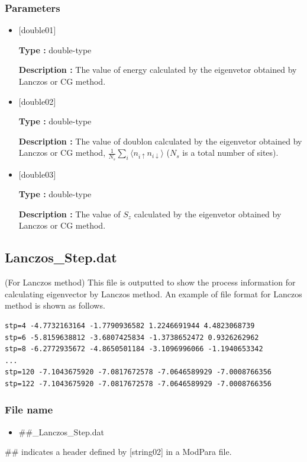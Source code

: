 \subsubsection{Parameters}
 \begin{itemize}

  \item  $[$double01$]$
  
 {\bf Type :} double-type

{\bf Description :} The value of energy calculated by the eigenvetor obtained by Lanczos or CG method.
 
  \item  $[$double02$]$

 {\bf Type :} double-type 

{\bf Description :}  The value of doublon calculated by the eigenvetor obtained by Lanczos or CG method,
$\frac{1}{N_s} \sum_{i}\langle n_{i\uparrow}n_{i\downarrow}\rangle$ ($N_s$ is a total number of sites).

  \item  $[$double03$]$

 {\bf Type :} double-type 

{\bf Description :}  The value of $S_z$ calculated by the eigenvetor obtained by Lanczos or CG method.

 \end{itemize}


\newpage
\subsection{Lanczos\_Step.dat}
(For Lanczos method) 
This file is outputted to show the process information for calculating eigenvector by Lanczos method.
An example of file format for Lanczos method is shown as follows.\\
\begin{minipage}{15cm}
\begin{screen}
\begin{verbatim}
stp=4 -4.7732163164 -1.7790936582 1.2246691944 4.4823068739
stp=6 -5.8159638812 -3.6807425834 -1.3738652472 0.9326262962
stp=8 -6.2772935672 -4.8650501184 -3.1096996066 -1.1940653342
...
stp=120 -7.1043675920 -7.0817672578 -7.0646589929 -7.0008766356
stp=122 -7.1043675920 -7.0817672578 -7.0646589929 -7.0008766356
\end{verbatim}
\end{screen}
\end{minipage}

\subsubsection{File name}
 \begin{itemize}
   \item  \#\#\_Lanczos\_Step.dat
  \end{itemize}
 \#\# indicates a header defined by [string02] in a ModPara file.

